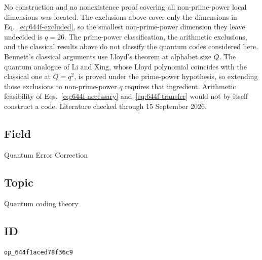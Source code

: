 No construction and no nonexistence proof covering all non-prime-power local
dimensions was located.  The exclusions above cover only the dimensions in
Eq.~\eqref{eq:644f-excluded}, so the smallest non-prime-power dimension they
leave undecided is $q=26$.  The prime-power classification, the arithmetic
exclusions, and the classical results above do not classify the quantum codes
considered here.  Bennett's classical arguments use Lloyd's theorem at alphabet
size $Q$.  The quantum analogue of Li and Xing, whose Lloyd polynomial coincides
with the classical one at $Q=q^2$, is proved under the prime-power hypothesis,
so extending those exclusions to non-prime-power $q$ requires that ingredient.
Arithmetic feasibility of Eqs.~\eqref{eq:644f-necessary}
and~\eqref{eq:644f-transfer} would not by itself construct a code.  Literature
checked through 15 September 2026.

\subsection*{Field}

Quantum Error Correction

\subsection*{Topic}

Quantum coding theory

\subsection*{ID}

\texttt{op\_644f1aced78f36c9}
